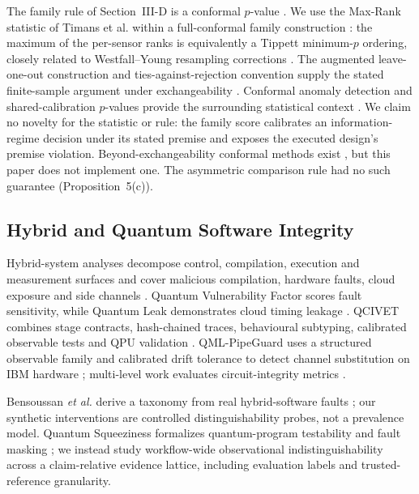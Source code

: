 \documentclass[10pt,journal,compsoc]{IEEEtran}
\begin{document}
The family rule of Section~III-D is a conformal $p$-value
\cite{Vovk2005,Angelopoulos2023}. We use the Max-Rank statistic of Timans
et al. within a full-conformal family construction \cite{Timans2025}: the
maximum of the per-sensor ranks is equivalently a Tippett minimum-$p$
ordering, closely related to Westfall--Young resampling corrections
\cite{Tippett1931,Westfall1993}. The augmented leave-one-out construction and
ties-against-rejection convention supply the stated finite-sample argument
under exchangeability \cite{Vovk2005,Lei2018}. Conformal anomaly detection and
shared-calibration $p$-values provide the surrounding statistical context
\cite{Laxhammar2015,Bates2023}. We claim no novelty for the statistic or rule:
the family score calibrates an information-regime decision under its stated
premise and exposes the executed design's premise violation. Beyond-exchangeability conformal
methods exist \cite{Barber2023}, but this paper does not implement one. The
asymmetric comparison rule had no such guarantee (Proposition~5(c)).

\subsection{Hybrid and Quantum Software Integrity}

Hybrid-system analyses decompose control, compilation, execution and
measurement surfaces and cover malicious compilation, hardware faults, cloud
exposure and side channels \cite{Volya2023,Ghosh2025,Saki2022}. Quantum
Vulnerability Factor scores fault sensitivity, while Quantum Leak demonstrates
cloud timing leakage \cite{Oliveira2024,Lu2025}. QCIVET combines stage
contracts, hash-chained traces, behavioural subtyping, calibrated observable
tests and QPU validation \cite{YeniarasKarimov2026}. QML-PipeGuard uses a
structured observable family and calibrated drift tolerance to detect channel
substitution on IBM hardware \cite{Yeniaras2026PipeGuard}; multi-level work
evaluates circuit-integrity metrics \cite{Ahmed2026}.

Bensoussan \emph{et al.} derive a taxonomy from real hybrid-software faults
\cite{Bensoussan2026Taxonomy}; our synthetic interventions are controlled
distinguishability probes, not a prevalence model. Quantum Squeeziness
formalizes quantum-program testability and fault masking
\cite{Bensoussan2026Squeeziness}; we instead study workflow-wide observational
indistinguishability across a claim-relative evidence lattice, including
evaluation labels and trusted-reference granularity.
\end{document}
